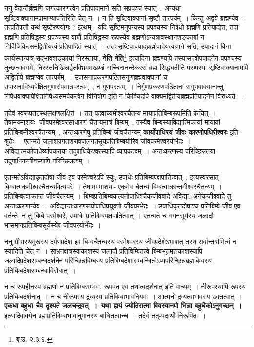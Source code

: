 	ननु वेदान्तैर्ब्रह्मणि जगत्कारणत्वेन प्रतिपाद्यमाने सति सप्रपञ्चं स्यात्~, अन्यथा सृष्टिवाक्यानामप्रामाण्यापत्तिरिति चेत् न~। न हि सृष्टिवाक्यानां सृष्टौ तात्पर्यम्~। किन्तु अद्वये ब्रह्मण्येव~। तत्प्रतिपत्तौ कथं सृष्टेरुपयोगः ? इत्थम् - यदि सृष्टिमनुपन्यस्य प्रपञ्चस्य निषेधो ब्रह्मणि प्रतिपाद्येत, तदा ब्रह्मणि प्रतिषिद्धस्य प्रपञ्चस्य वायौ प्रतिषिद्धस्य रूपस्येव ब्रह्मणोऽन्यत्रावस्थानशङ्कायां न निर्विचिकित्समद्वितीयत्वं प्रतिपादितं स्यात्~। ततः सृष्टिवाक्याद्ब्रह्मोपादेयत्वज्ञाने सति, उपादानं विना कार्यस्यान्यत्र सद्भावशङ्कायां निरस्तायां, {\bfseries नेति नेति}\footnote{बृ.उ. २.३.६.} इत्यादिना ब्रह्मण्यपि तस्यासत्त्वोपपादनेन प्रपञ्चस्य तुच्छत्वावगमे, निरस्तनिखिलद्वैतविभ्रममखण्डं सच्चिदानन्दैकरसं ब्रह्म सिद्ध्यतीति परम्परया सृष्टिवाक्यानामपि अद्वितीये ब्रह्मण्येव तात्पर्यम्~। उपासनाप्रकरणपठितसगुणब्रह्मवाक्यानां च उपासनाविध्यपेक्षितगुणारोपमात्रपरत्वम्~, न गुणपरत्वम्~। निर्गुणप्रकरणपठितानां सगुणवाक्यानान्तु निषेधवाक्यापेक्षितनिषेध्यसमर्पकत्वेन विनियोग इति न किञ्चिदपि वाक्यमद्वितीयब्रह्मप्रतिपादनेन विरुध्यते~।\par
	तदेवं स्वरूपतटस्थलक्षणलक्षितं~। तत्-पदवाच्यमीश्वरचैतन्यं मायाप्रतिबिम्बरूपमिति केचित्~। तेषामयमाशयः- जीवपरमेश्वरसाधारणं चैतन्यमात्रं बिम्बम्~, तस्यैव बिम्बस्याविद्यात्मिकायां मायायां प्रतिबिम्बमीश्वरचैतन्यम्~, अन्तःकरणेषु प्रतिबिम्बं जीवचैतन्यम् {\bfseries कार्योपाधिरयं जीवः कारणोपधिरीश्वरः} इति श्रुतेः~। एतन्मते जलाशयगतशरावजलगतसूर्यप्रतिबिम्बयोरिव जीवपरमेश्वरयोर्भेदः~। अविद्यात्मकोपाधेर्व्यापकतया तदुपाधिकेश्वरस्यापि व्यापकत्वम्~। अन्तःकरणस्य परिच्छिन्नतया तदुपाधिकजीवस्यापि परिच्छिन्नत्वम्~।\par
	एतन्मतेऽविद्याकृतदोषा जीव इव परमेश्वरेऽपि स्युः, उपाधेः प्रतिबिम्बपक्षपातित्वात्~, इत्यस्वरसात् बिम्बात्मकमीश्वरचैतन्यमित्यपरे~। तेषामयमाशयः- एकमेव चैतन्यं बिम्बत्वाक्रान्तमीश्वरचैतन्यम्~। प्रतिबिम्बत्वाक्रान्तं जीवचैतन्यम्~। बिम्बप्रतिबिम्बकल्पनोपाधिश्चैकजीववादे अविद्या, अनेकजीववादे तु अन्तःकरणान्येव~। अविद्यान्तःकरणरूपोपाधिप्रयुक्तो जीवपरभेदः~। उपाधिकृतदोषाश्च प्रतिबिम्बे जीव एव वर्तन्ते, न तु बिम्बे परमेश्वरे, उपाधेः प्रतिबिम्बपक्षपातित्वात्~। एतन्मते च गगनसूर्यस्य जलादौ भासमानप्रतिबिम्बसूर्यस्येव जीवपरयोर्भेदः~।\par
	ननु ग्रीवास्थमुखस्य दर्पणप्रदेश इव बिम्बचैतन्यस्य परमेश्वरस्य जीवप्रदेशेऽभावात् तस्य सर्वान्तर्यामित्वं न स्यादिति चेत् न~। साभ्रनक्षत्रस्याकाशस्य जलादौ प्रतिबिम्बितत्वे बिम्बभूतमहाकाशस्यापि जलादिप्रदेशसम्बन्धदर्शनेन परिच्छिन्नबिम्बस्य प्रतिबिम्बदेशासम्बन्धित्वेऽप्यपरिच्छिन्नब्रह्मबिम्बस्य प्रतिबिम्बदेशसम्बन्धाविरोधात्~। \par
	न च रूपहीनस्य ब्रह्मणो न प्रतिबिम्बसम्भवः, रूपवत एव तथात्वदर्शनात् इति वाच्यम्~। नीरूपस्यापि रूपस्य प्रतिबिम्बदर्शनात्~। न च नीरूपस्य द्रव्यस्य प्रतिबिम्बाभावनियमः~। आत्मनो द्रव्यत्वाभावस्य उक्तत्वात्~। {\bfseries एकधा बहुधा चैव दृश्यते जलचन्द्रवत्~।}, {\bfseries यथा ह्ययं ज्योतिरात्मा विवस्वानपो भिन्ना बहुधैकोऽनुगच्छन्~।} इत्यादिवाक्येन ब्रह्मप्रतिबिम्बाभावानुमानस्य बाधितत्वाच्च~। तदेवं तत्-पदार्थो निरूपितः~।\par
